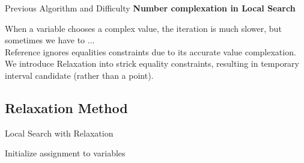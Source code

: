 \begin{frame}{Previous Algorithm and Difficulty}
    \textbf{Number complexation in Local Search}


    When a variable chooses a complex value, the iteration is much slower, but sometimes we have to ...\\
    Reference  ignores equalities constraints due to its accurate value complexation.\\
    We introduce Relaxation into strick equality constraints, resulting in temporary interval candidate (rather than a point). \\
\end{frame}

\subsection{Relaxation Method}

\begin{frame}{Local Search with Relaxation}
    \scriptsize
    \begin{algorithm}[H]
\label{alg:relax}
Initialize assignment to variables\; 
    \end{algorithm}
\end{frame}

